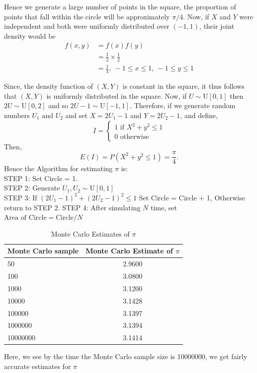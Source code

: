 Hence we generate a large number of points in the square, the proportion of points that fall within the circle will be approximately $\pi/4$.
Now, if $X$ and $Y$ were independent and both were uniformly distributed over $(-1,1)$, their joint density would be
\begin{align*}
	f(x,y) & = f(x)f(y)                                         \\
	       & = \frac{1}{2} \times \frac{1}{2}                   \\
	       & = \frac{1}{4} , \  -1 \le x \le 1,\ -1 \le y \le 1
\end{align*}

Since, the density function of $(X,Y)$ is constant in the square, it thus follows that $(X,Y)$ is uniformly distributed in the square.
Now, if $U\sim \text{U}[0,1]$ then $2U\sim \text{U}[0,2]$ and so $2U-1\sim \text{U}[-1,1]$. Therefore, if we generate random numbers $U_1 \text{ and }  U_2$
and set $X=2U_1 - 1$ and $Y= 2U_2-1$, and define,
\[
	I = \begin{cases}
		1 \text{ if } X ^{2} + y ^{2} \le 1 \\
		0 \text{ otherwise }
	\end{cases}
\]
Then,
\[
	E(I)=P(X ^{2} + y ^{2} \le 1) = \frac{\pi}{4}.
\]
Hence the Algorithm for estimating $\pi$ is:\\
STEP 1: Set Circle = 1. \\
STEP 2: Generate $U_1, U_2\sim \text{U}[0,1]$\\
STEP 3: If $(2U_1-1)^{2}+ (2U_2-1)^{2} \le 1$ Set Circle = Circle + 1, Otherwise return to STEP 2.
STEP 4: After simulating $N$ time, set $\text{Area of Circle}  = \text{Circle}  / N$

\begin{table}[H]
	\centering
	\begin{tabular}{l c}
		\hline
		Monte Carlo sample & Monte Carlo Estimate of $\pi$ \\
		\hline
		50                 & 2.9600                        \\
		100                & 3.0800                        \\
		1000               & 3.1200                        \\
		10000              & 3.1428                        \\
		100000             & 3.1397                        \\
		1000000            & 3.1394                        \\
		10000000           & 3.1414                        \\
		\hline
	\end{tabular}
	\caption{Monte Carlo Estimates of $\pi$}
	\label{tab:montecarlopi}
\end{table}
Here, we see by the time the Monte Carlo sample size is 10000000, we get fairly accurate estimates for $\pi$


